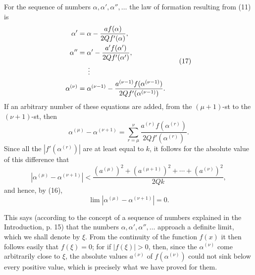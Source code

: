 \documentclass[11pt]{article}
\begin{document}
For the sequence of numbers $\alpha,\alpha',\alpha'',\ldots$ the law of formation resulting from (11) is
\begin{equation}
\begin{aligned}
 \alpha'&=\alpha-\frac{a f(\alpha)}{2Q f'(\alpha)},\\
 \alpha''&=\alpha'-\frac{a' f(\alpha')}{2Q f'(\alpha')},\\
 &\hspace{1.5em}\vdots\\
 \alpha^{(\nu)}&=\alpha^{(\nu-1)}-
 \frac{a^{(\nu-1)} f(\alpha^{(\nu-1)})}{2Q f'(\alpha^{(\nu-1)})}.
\end{aligned}
\tag{17}
\end{equation}
If an arbitrary number of these equations are added, from the $(\mu+1)$-st to the $(\nu+1)$-st, then
\begin{equation}
 \alpha^{(\mu)}-\alpha^{(\nu+1)}=
 \sum_{r=\mu}^{\nu}\frac{a^{(r)}f(\alpha^{(r)})}{2Q f'(\alpha^{(r)})}.
\tag{18}
\end{equation}
Since all the $|f'(\alpha^{(r)})|$ are at least equal to $k$, it follows for the absolute value of this difference that
\begin{equation}
 |\alpha^{(\mu)}-\alpha^{(\nu+1)}|<
 \frac{(a^{(\mu)})^2+(a^{(\mu+1)})^2+\cdots+(a^{(\nu)})^2}{2Qk},
\tag{19}
\end{equation}
and hence, by (16),
\begin{equation}
 \lim |\alpha^{(\mu)}-\alpha^{(\nu+1)}|=0.
\tag{20}
\end{equation}

This says (according to the concept of a sequence of numbers explained in the Introduction, p. 15) that the numbers $\alpha,\alpha',\alpha'',\ldots$ approach a definite limit, which we shall denote by $\xi$. From the continuity of the function $f(x)$ it then follows easily that $f(\xi)=0$; for if $|f(\xi)|>0$, then, since the $\alpha^{(\nu)}$ come arbitrarily close to $\xi$, the absolute values $a^{(\nu)}$ of $f(\alpha^{(\nu)})$ could not sink below every positive value, which is precisely what we have proved for them.
\end{document}
